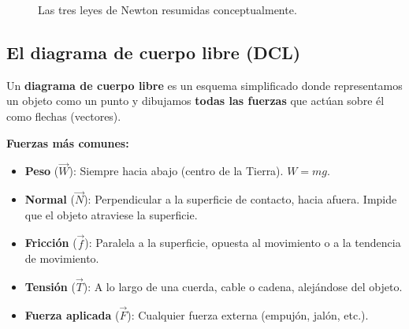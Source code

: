 \documentclass[12pt, letterpaper]{article}
\begin{document}
\begin{figure}[h!]
  \caption{Las tres leyes de Newton resumidas conceptualmente.}
  \label{fig:newton}
\end{figure}

\subsection{El diagrama de cuerpo libre (DCL)}

Un \textbf{diagrama de cuerpo libre} es un esquema simplificado donde representamos un objeto como un punto y dibujamos \textbf{todas las fuerzas} que actúan sobre él como flechas (vectores).

\begin{cuadrosolucion}
  \textbf{Fuerzas más comunes:}
  \begin{itemize}[leftmargin=*]
    \item \textbf{Peso} ($\vec{W}$): Siempre hacia abajo (centro de la Tierra). $W = mg$.
    \item \textbf{Normal} ($\vec{N}$): Perpendicular a la superficie de contacto, hacia afuera. Impide que el objeto atraviese la superficie.
    \item \textbf{Fricción} ($\vec{f}$): Paralela a la superficie, opuesta al movimiento o a la tendencia de movimiento.
    \item \textbf{Tensión} ($\vec{T}$): A lo largo de una cuerda, cable o cadena, alejándose del objeto.
    \item \textbf{Fuerza aplicada} ($\vec{F}$): Cualquier fuerza externa (empujón, jalón, etc.).
  \end{itemize}
\end{cuadrosolucion}
\end{document}
